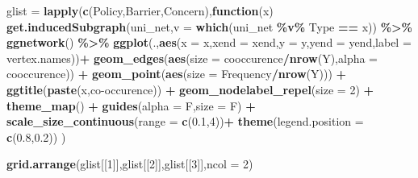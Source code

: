 \documentclass[
]{article}
\newenvironment{Shaded}{\begin{snugshade}}{\end{snugshade}}
\newcommand{\ControlFlowTok}[1]{\textcolor[rgb]{0.13,0.29,0.53}{\textbf{#1}}}
\newcommand{\DataTypeTok}[1]{\textcolor[rgb]{0.13,0.29,0.53}{#1}}
\newcommand{\DecValTok}[1]{\textcolor[rgb]{0.00,0.00,0.81}{#1}}
\newcommand{\FloatTok}[1]{\textcolor[rgb]{0.00,0.00,0.81}{#1}}
\newcommand{\KeywordTok}[1]{\textcolor[rgb]{0.13,0.29,0.53}{\textbf{#1}}}
\newcommand{\NormalTok}[1]{#1}
\newcommand{\OperatorTok}[1]{\textcolor[rgb]{0.81,0.36,0.00}{\textbf{#1}}}
\newcommand{\StringTok}[1]{\textcolor[rgb]{0.31,0.60,0.02}{#1}}
\begin{document}
\begin{Shaded}
\begin{Highlighting}[]
\NormalTok{glist =}\StringTok{ }\KeywordTok{lapply}\NormalTok{(}\KeywordTok{c}\NormalTok{(}\StringTok{\textquotesingle{}Policy\textquotesingle{}}\NormalTok{,}\StringTok{\textquotesingle{}Barrier\textquotesingle{}}\NormalTok{,}\StringTok{\textquotesingle{}Concern\textquotesingle{}}\NormalTok{),}\ControlFlowTok{function}\NormalTok{(x) }\KeywordTok{get.inducedSubgraph}\NormalTok{(uni\_net,}\DataTypeTok{v =} \KeywordTok{which}\NormalTok{(uni\_net }\OperatorTok{\%v\%}\StringTok{ \textquotesingle{}Type\textquotesingle{}} \OperatorTok{==}\StringTok{ }\NormalTok{x)) }\OperatorTok{\%\textgreater{}\%}\StringTok{ }\KeywordTok{ggnetwork}\NormalTok{() }\OperatorTok{\%\textgreater{}\%}\StringTok{ }
\StringTok{         }\KeywordTok{ggplot}\NormalTok{(.,}\KeywordTok{aes}\NormalTok{(}\DataTypeTok{x =}\NormalTok{ x,}\DataTypeTok{xend =}\NormalTok{ xend,}\DataTypeTok{y =}\NormalTok{ y,}\DataTypeTok{yend =}\NormalTok{ yend,}\DataTypeTok{label =}\NormalTok{ vertex.names))}\OperatorTok{+}\StringTok{ }
\StringTok{  }\KeywordTok{geom\_edges}\NormalTok{(}\KeywordTok{aes}\NormalTok{(}\DataTypeTok{size =}\NormalTok{ cooccurence}\OperatorTok{/}\KeywordTok{nrow}\NormalTok{(Y),}\DataTypeTok{alpha =}\NormalTok{ cooccurence)) }\OperatorTok{+}
\StringTok{  }\KeywordTok{geom\_point}\NormalTok{(}\KeywordTok{aes}\NormalTok{(}\DataTypeTok{size =}\NormalTok{ Frequency}\OperatorTok{/}\KeywordTok{nrow}\NormalTok{(Y))) }\OperatorTok{+}\StringTok{ }
\StringTok{    }\KeywordTok{ggtitle}\NormalTok{(}\KeywordTok{paste}\NormalTok{(x,}\StringTok{\textquotesingle{}co{-}occurence\textquotesingle{}}\NormalTok{)) }\OperatorTok{+}\StringTok{ }
\StringTok{  }\KeywordTok{geom\_nodelabel\_repel}\NormalTok{(}\DataTypeTok{size =} \DecValTok{2}\NormalTok{) }\OperatorTok{+}\StringTok{ }\KeywordTok{theme\_map}\NormalTok{() }\OperatorTok{+}\StringTok{ }\KeywordTok{guides}\NormalTok{(}\DataTypeTok{alpha =}\NormalTok{ F,}\DataTypeTok{size =}\NormalTok{ F) }\OperatorTok{+}\StringTok{ }
\StringTok{  }\KeywordTok{scale\_size\_continuous}\NormalTok{(}\DataTypeTok{range =} \KeywordTok{c}\NormalTok{(}\FloatTok{0.1}\NormalTok{,}\DecValTok{4}\NormalTok{))}\OperatorTok{+}
\StringTok{  }\KeywordTok{theme}\NormalTok{(}\DataTypeTok{legend.position =} \KeywordTok{c}\NormalTok{(}\FloatTok{0.8}\NormalTok{,}\FloatTok{0.2}\NormalTok{))}
\NormalTok{         )}

\KeywordTok{grid.arrange}\NormalTok{(glist[[}\DecValTok{1}\NormalTok{]],glist[[}\DecValTok{2}\NormalTok{]],glist[[}\DecValTok{3}\NormalTok{]],}\DataTypeTok{ncol =} \DecValTok{2}\NormalTok{)}
\end{Highlighting}
\end{Shaded}
\end{document}
